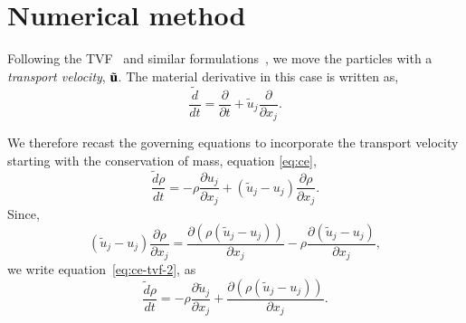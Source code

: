 \section{Numerical method}

Following the TVF~\citep{Adami2013} and similar
formulations~\citep{oger_ale_sph_2016}, we move the particles with a
\emph{transport velocity}, $\tilde{\mathbf{u}}$. The material derivative in this
case is written as,
\begin{equation}
  \label{eq:modified-material-derivative}
  \frac{\tilde{d} }{d t} = \frac{\partial }{\partial t} +
  \tilde{u}_j \frac{\partial }{\partial x_j}.
\end{equation}

We therefore recast the governing equations to incorporate the transport
velocity starting with the conservation of mass, equation \eqref{eq:ce},
\begin{equation}
  \label{eq:ce-tvf-2}
  \frac{\tilde{d} \rho}{d t} = - \rho \frac{\partial u_j}{\partial x_j}+
  (\tilde{u}_j - u_j) \frac{\partial \rho} {\partial x_j}.
\end{equation}
Since,
\begin{equation}
  \label{eq:tmp:div-vv}
  (\tilde{u}_j - u_j)  \frac{\partial \rho}{\partial x_j} =
  \frac{\partial (\rho (\tilde{u}_j - u_j))}{\partial x_j} -
  \rho \frac{\partial (\tilde{u}_j - u_j)}{\partial x_j},
\end{equation}
we write equation~\eqref{eq:ce-tvf-2}, as
\begin{equation}
  \label{eq:ce-tvf}
  \frac{\tilde{d} \rho}{d t} =
  - \rho \frac{\partial \tilde{u}_j}{\partial x_j} +
  \frac{\partial (\rho (\tilde{u}_j - u_j))}{\partial x_j}.
\end{equation}

